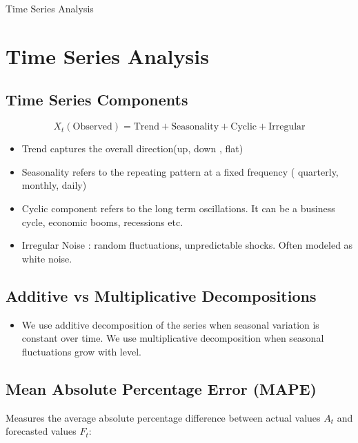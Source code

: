 \documentclass[10pt,a4paper]{article}
\newcommand{\NoteTitle}{Time Series Analysis}
\newcommand{\NoteAuthor}{Thomaskutty Reji}
\begin{document}
\begin{titlepage}
  \vspace*{0.25\textheight}
  {\LARGE \textcolor{tocblue}{\NoteTitle}}\par
  \author{\NoteAuthor}
  \date{}
\end{titlepage}

\label{toc}
\tableofcontents
\newpage
\section{Time Series Analysis}
	\subsection{Time Series Components}
	$$
	X_t (\text{Observed}) = \text{Trend} + \text{Seasonality} + \text{Cyclic} + \text{Irregular}
	$$
	
	
	\begin{itemize} 
	    \item Trend captures the overall direction(up, down , flat)
	    \item Seasonality refers to the repeating pattern at a fixed frequency ( quarterly, monthly, daily)
	    \item Cyclic component refers to the long term oscillations. It can be a business cycle, economic booms, recessions etc.
	    \item Irregular Noise : random fluctuations, unpredictable shocks. Often modeled as white noise.
	\end{itemize}
	
	\subsection{Additive vs Multiplicative Decompositions}
	
	\begin{itemize}
	    \item We use additive decomposition of the series when seasonal variation is constant over time. We use multiplicative decomposition when seasonal fluctuations grow with level. 
	\end{itemize}
	
	
	\subsection{Mean Absolute Percentage Error (MAPE)}
	Measures the average absolute percentage difference between actual values $A_t$ and forecasted values $F_t$:
	
\end{document}
